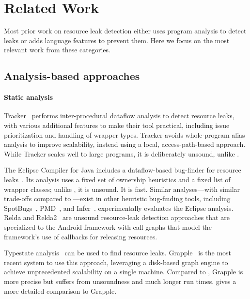 \section{Related Work}
\label{sec:relatedwork}

Most prior work on resource leak detection either uses
program analysis to detect leaks or adds language features to prevent
them. Here we focus on the most relevant work from these categories.

\subsection{Analysis-based approaches}\label{sec:rw-analysis}


\paragraph{Static analysis}
Tracker~\cite{TorlakC10} performs inter-procedural dataflow analysis to detect
resource leaks, with various additional features to make their tool practical,
including issue prioritization and handling of wrapper types.  Tracker avoids
whole-program alias analysis to improve scalability, instead using a local,
access-path-based approach.  While Tracker scales well to large programs, it is
deliberately unsound, unlike \Tool.

The Eclipse Compiler for Java includes a dataflow-based
bug-finder for resource leaks~\cite{ecj-resource-leak}. Its analysis
uses a fixed set of ownership heuristics and a fixed list of wrapper
classes; unlike \Tool, it is unsound. It is fast.  Similar analyses---with similar trade-offs
compared to \Tool---exist in other heuristic bug-finding tools,
including SpotBugs~\cite{spotbugs-resource-leak},
PMD~\cite{pmd-resource-leak}, and Infer~\cite{infer-resource-leak}.
 experimentally evaluates the Eclipse analysis.
Relda and Relda2~\cite{guo2013characterizing,wu2016relda2} are unsound
resource-leak detection approaches that are specialized to the Android framework
with call graphs that model the framework's use of callbacks for
releasing resources.

Typestate analysis~\cite{StromY86,FinkYDRG2008} can be used to
find resource leaks.  Grapple~\cite{zuo2019grapple} is the most recent system to
use this approach, leveraging a disk-based graph engine to achieve unprecedented
scalability on a single machine.  Compared to \Tool, Grapple
is more precise but
suffers from unsoundness and much longer run times.
 gives a more detailed comparison to Grapple.

